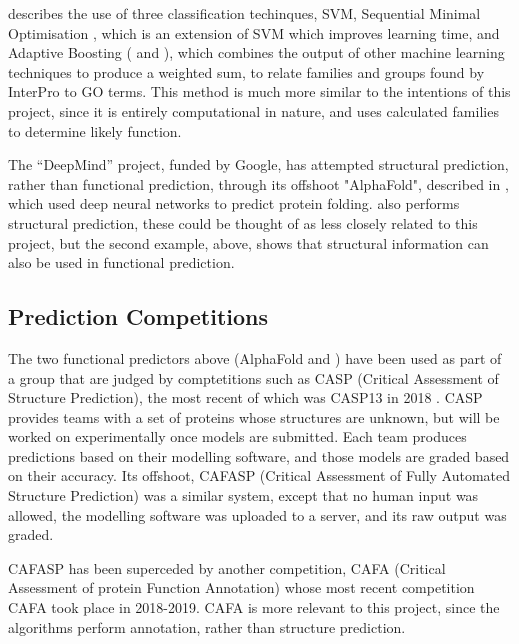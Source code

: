 \documentclass[12pt]{report}
\begin{document}
		\cite{RefWorks:doc:5d88a6d8e4b08db974488b16} describes the use of three classification techinques, SVM, Sequential Minimal Optimisation \citep{RefWorks:doc:5d88bafce4b0d12609fd641e}, which is an extension of SVM which improves learning time, and Adaptive Boosting (\cite{RefWorks:doc:5d88b8c6e4b0732b5fdb9dd5} and \cite{RefWorks:doc:5d88b89ce4b0d12609fd639c}), which combines the output of other machine learning techniques to produce a weighted sum, to relate families and groups found by InterPro \citep{RefWorks:doc:5d88a822e4b0d12609fd5fc4} to GO terms.  This method is much more similar to the intentions of this project, since it is entirely computational in nature, and uses calculated families to determine likely function.
		
			The ``DeepMind'' project, funded by Google, has attempted structural prediction, rather than functional prediction, through its offshoot "AlphaFold", described in \cite{RefWorks:doc:5d89ec21e4b02d8374a7bbe7}, which used deep neural networks to predict protein folding. \cite{RefWorks:doc:5d822dd5e4b07f40b9eae2f4} also performs structural prediction, these could be thought of as less closely related to this project, but the second example, above, shows that structural information can also be used in functional prediction.  

		\subsection{Prediction Competitions}
			
			The two functional predictors above (AlphaFold and \cite{RefWorks:doc:5d89ec21e4b02d8374a7bbe7}) have been used as part of a group that are judged by comptetitions such as CASP (Critical Assessment of Structure Prediction), the most recent of which was CASP13 in 2018 \citep{RefWorks:doc:5d822fa4e4b0fa10423c5184}.  CASP provides teams with a set of proteins whose structures are unknown, but will be worked on experimentally once models are submitted.  Each team produces predictions based on their modelling software, and those models are graded based on their accuracy.  Its offshoot, CAFASP (Critical Assessment of Fully Automated Structure Prediction) was a similar system, except that no human input was allowed, the modelling software was uploaded to a server, and its raw output was graded.  
		
			CAFASP has been superceded by another competition, CAFA (Critical Assessment of protein Function Annotation) \citep{RefWorks:doc:5d82345ae4b09beeb95d60bb} whose most recent competition CAFA took place in 2018-2019.  CAFA is more relevant to this project, since the algorithms perform annotation, rather than structure prediction.  
		
\end{document}

